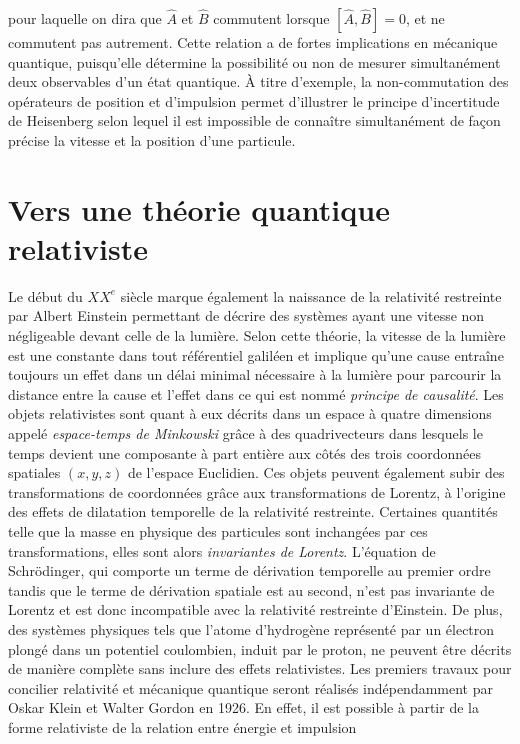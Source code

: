         pour laquelle on dira que $\hat{A}$ et $\hat{B}$ commutent lorsque $[\hat{A},\hat{B}]=0$, et ne commutent pas autrement. Cette relation a de fortes implications en mécanique quantique, puisqu'elle détermine la possibilité ou non de mesurer simultanément deux observables d'un état quantique. À titre d'exemple, la non-commutation des opérateurs de position et d'impulsion permet d'illustrer le principe d'incertitude de Heisenberg selon lequel il est impossible de connaître simultanément de façon précise la vitesse et la position d'une particule. 
    
        \section{Vers une théorie quantique relativiste}
        \label{verslarelat}
        
         Le début du $XX^e$ siècle marque également la naissance de la relativité restreinte par Albert Einstein permettant de décrire des systèmes ayant une vitesse non négligeable devant celle de la lumière. Selon cette théorie, la vitesse de la lumière est une constante dans tout référentiel galiléen et implique qu'une cause entraîne toujours un effet dans un délai minimal nécessaire à la lumière pour parcourir la distance entre la cause et l'effet dans ce qui est nommé \textit{principe de causalité}. Les objets relativistes sont quant à eux décrits dans un espace à quatre dimensions appelé \textit{espace-temps de Minkowski} grâce à des quadrivecteurs dans lesquels le temps devient une composante à part entière aux côtés des trois coordonnées spatiales $(x,y,z)$ de l'espace Euclidien. Ces objets peuvent également subir des transformations de coordonnées grâce aux transformations de Lorentz, à l'origine des effets de dilatation temporelle de la relativité restreinte. Certaines quantités telle que la masse en physique des particules sont inchangées par ces transformations, elles sont alors \textit{invariantes de Lorentz}. L'équation de Schrödinger, qui comporte un terme de dérivation temporelle au premier ordre tandis que le terme de dérivation spatiale est au second, n'est pas invariante de Lorentz et est donc incompatible avec la relativité restreinte d'Einstein. De plus, des systèmes physiques tels que l'atome d'hydrogène représenté par un électron plongé dans un potentiel coulombien, induit par le proton, ne peuvent être décrits de manière complète sans inclure des effets relativistes. Les premiers travaux pour concilier relativité et mécanique quantique seront réalisés indépendamment par Oskar Klein et Walter Gordon en 1926. En effet, il est possible à partir de la forme relativiste de la relation entre énergie et impulsion 
        
